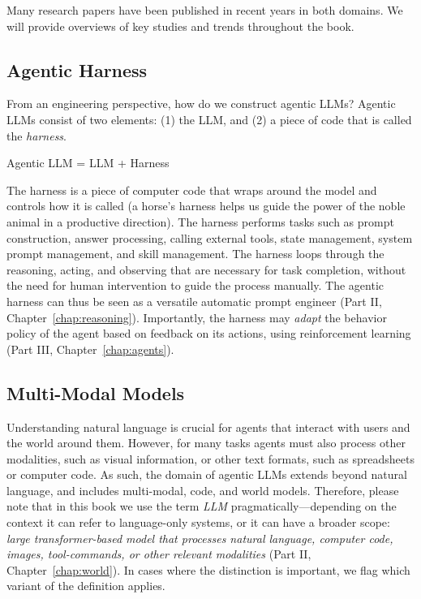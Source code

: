 
Many research papers have been published in recent years in both domains. We will provide overviews of key studies and trends throughout the book. 

\subsection{Agentic Harness}
From an engineering perspective, how do we construct agentic LLMs? Agentic LLMs consist of two elements: (1) the LLM, and (2) a piece of code that is called the {\em harness}. 
\begin{center}Agentic LLM = LLM + Harness\end{center}
The harness is a piece of computer code that wraps around the model and controls how it is called (a horse's harness helps us guide the  power of the noble animal in a productive direction). 
The harness performs tasks such as prompt construction, answer processing, calling external tools, state management, system prompt management, and skill management. The harness loops through the reasoning, acting, and observing that are necessary for task completion, without the need for human intervention to guide the process manually. The agentic harness can thus be seen as a versatile automatic prompt engineer (Part II, Chapter~\ref{chap:reasoning}). Importantly, the harness may {\em adapt} the behavior policy of the agent based on feedback on its actions, using reinforcement learning  (Part III, Chapter~\ref{chap:agents}).


\subsection{Multi-Modal Models}
Understanding natural language is crucial for agents that interact with users and the world around them. However, for many tasks agents must also process other modalities, such as visual information, or other text formats, such as spreadsheets or computer code. As such, the domain of agentic LLMs extends beyond natural language, and includes multi-modal, code, and world models. 
Therefore, please note that in this book we use the term {\em LLM} pragmatically---depending on the context it can  refer to language-only systems, or it can have a broader scope:  {\em large transformer-based model that processes natural language, computer code, images, tool-commands, or other relevant modalities} (Part II, Chapter~\ref{chap:world}). In cases where the distinction is important, we flag which variant of the definition applies.

